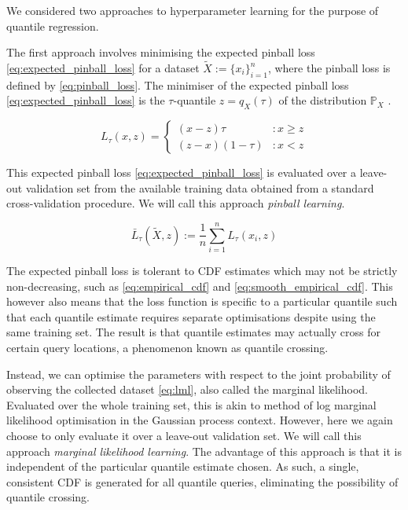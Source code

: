 \documentclass[twoside]{article} \usepackage{aistats2017}
\theoremstyle{definition}
\theoremstyle{theorem}
\newcommand{\rv}[1]{{#1}}
\newcommand{\ds}[1]{\tilde{#1}}
\begin{document}
	We considered two approaches to hyperparameter learning for the purpose of quantile regression.
	
	The first approach involves minimising the expected pinball loss \eqref{eq:expected_pinball_loss} for a dataset $\ds{X} := \{x_{i}\}_{i = 1}^{n}$, where the pinball loss is defined by \eqref{eq:pinball_loss}. The minimiser of the expected pinball loss \eqref{eq:expected_pinball_loss} is the $\tau$-quantile $z = q_{\rv{X}}(\tau)$ of the distribution $\mathbb{P}_{\rv{X}}$ \citep{koenker1978regression}.
	
	\begin{equation}
		L_{\tau}(x, z) = \left\{ \begin{array}{lr}
			(x - z) \tau & : x \geq z \\
			(z - x) (1 - \tau) & : x < z
		\end{array} \right.
	\label{eq:pinball_loss}
	\end{equation}
	
	This expected pinball loss \eqref{eq:expected_pinball_loss} is evaluated over a leave-out validation set from the available training data obtained from a standard cross-validation procedure. We will call this approach \textit{pinball learning}.
	
	\begin{equation}
		\bar{L}_{\tau}(\ds{X}, z) := \frac{1}{n} \sum_{i = 1}^{n} L_{\tau}(x_{i}, z)
	\label{eq:expected_pinball_loss}
	\end{equation}
	
	The expected pinball loss is tolerant to CDF estimates which may not be strictly non-decreasing, such as \eqref{eq:empirical_cdf} and \eqref{eq:smooth_empirical_cdf}. This however also means that the loss function is specific to a particular quantile such that each quantile estimate requires separate optimisations despite using the same training set. The result is that quantile estimates may actually cross for certain query locations, a phenomenon known as quantile crossing.
	
	Instead, we can optimise the parameters with respect to the joint probability of observing the collected dataset \eqref{eq:lml}, also called the marginal likelihood. Evaluated over the whole training set, this is akin to method of log marginal likelihood optimisation in the Gaussian process context. However, here we again choose to only evaluate it over a leave-out validation set. We will call this approach \textit{marginal likelihood learning}. The advantage of this approach is that it is independent of the particular quantile estimate chosen. As such, a single, consistent CDF is generated for all quantile queries, eliminating the possibility of quantile crossing. 
	
\end{document}

